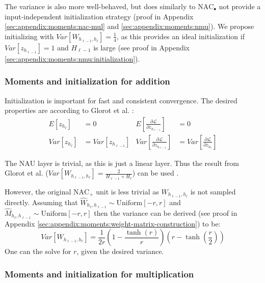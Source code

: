 The variance is also more well-behaved, but does similarly to $\mathrm{NAC}_{\bullet}$ not provide a input-independent initialization strategy (proof in Appendix \ref{sec:appendix:moments:nac-mul} and \ref{sec:appendix:moments:nmu}). We propose initializing with $Var[W_{h_{\ell-1},h_\ell}] = \frac{1}{4}$, as this provides an ideal initialization if $Var[z_{h_{\ell-1}}] = 1$ and $H_{\ell-1}$ is large (see proof in Appendix \ref{sec:appendix:moments:nmu:initialization}).

\subsubsection{Moments and initialization for addition} \label{sssec:nac-add-moments}

Initialization is important for fast and consistent convergence. The desired properties are according to Glorot et al. \cite{glorot-initialization}:
\begin{equation}
\begin{aligned}
E[z_{h_\ell}] &= 0 & E\left[\frac{\partial \mathcal{L}}{\partial z_{h_{\ell-1}}}\right] &= 0 \\
Var[z_{h_\ell}] &= Var\left[z_{h_{\ell-1}}\right] &
Var\left[\frac{\partial \mathcal{L}}{\partial z_{h_{\ell-1}}}\right] &= Var\left[\frac{\partial \mathcal{L}}{\partial z_{h_{\ell}}}\right]
\end{aligned}
\end{equation}

The $\mathrm{NAU}$ layer is trivial, as this is just a linear layer. Thus the result from Glorot et al. ($Var[W_{h_{\ell-1},h_{\ell}}] = \frac{2}{H_{\ell-1} + H_{\ell}}$) can be used \cite{glorot-initialization}.

However, the original $\mathrm{NAC}_{+}$ unit is less trivial as $W_{h_{\ell-1},h_{\ell}}$ is not sampled directly. Assuming that $\hat{W}_{h_\ell, h_{\ell-1}} \sim \mathrm{Uniform}[-r, r]$ and $\hat{M}_{h_\ell, h_{\ell-1}} \sim \mathrm{Uniform}[-r, r]$ then the variance can be derived (see proof in Appendix \ref{sec:appendix:moments:weight-matrix-construction}) to be:
\begin{equation}
Var[W_{h_{\ell-1},h_{\ell}}] = \frac{1}{2r} \left(1 - \frac{\tanh(r)}{r}\right) \left(r - \tanh\left(\frac{r}{2}\right)\right)
\end{equation}
One can the solve for $r$, given the desired variance.

\subsubsection{Moments and initialization for multiplication} \label{sssec:nac-mul-moments}

